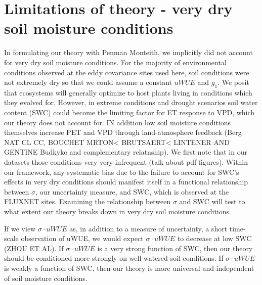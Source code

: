 \documentclass[draft,linenumbers]{agujournal}
\begin{document}
\section{Limitations of theory - very dry soil moisture conditions}
In formulating our theory with Penman Monteith, we implicitly did not account for very dry soil moisture conditions. For the majority of environmental conditions  observed at the eddy covariance sites used here, soil conditions were not extremely dry so that we could assume a constant $uWUE$ and $g_1$. We posit that ecosystems will generally optimize to host plants living in conditions which they evolved for. However, in extreme conditions and drought scenarios soil water content (SWC) could become the limiting factor for ET response to VPD, which our theory does not account for. IN addition low soil moisture conditions themselves increase PET and VPD through land-atmosphere feedback (Berg NAT CL CC, BOUCHET MRTON< BRUTSAERT< LINTENER AND GENTINE Budkyko and complementary relatnship). We first note that in our datasets those conditions very very infrequent (talk about pdf figures). Within our framework, any systematic bias due to the  failure to account for SWC's effects in very dry conditions should manifest itself in a functional relationship between $\sigma$, our uncertainty measure, and SWC, which is observed at the FLUXNET sites. Examining the relationship between $\sigma$ and SWC will test to what extent our theory breaks down in very dry soil moisture conditions.

If we view $\sigma \cdot uWUE$ as, in addition to a measure of uncertainty, a short time-scale observation of uWUE, we would expect $\sigma \cdot uWUE$ to decrease at low SWC (ZHOU ET AL). If $\sigma \cdot uWUE$ is a very strong function of SWC, then our theory should be conditioned more strongly on well watered soil conditions. If $\sigma \cdot uWUE$ is weakly a function of SWC, then our theory is more universal and independent of soil moisture conditions.
\end{document}
